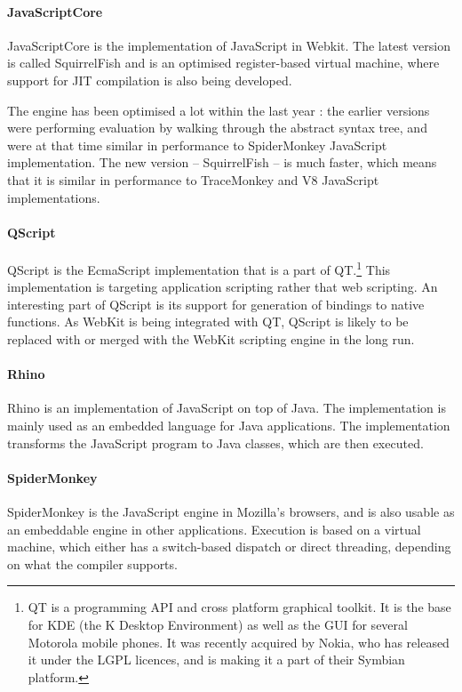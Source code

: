 \documentclass[11pt]{report}
\begin{document}
\paragraph{JavaScriptCore} 
JavaScriptCore \cite{webkit-src} is the implementation of JavaScript in Webkit.
The latest version is called SquirrelFish and is an optimised register-based virtual machine,
where support for JIT compilation is also being developed.

The engine has been optimised a lot within the last year 
\cite{squirrelfish-bench}: the earlier versions were performing evaluation by walking through the abstract syntax tree, and were at that time similar in performance to SpiderMonkey JavaScript implementation.
The new version -- SquirrelFish -- is much faster, which means that it is similar in performance to TraceMonkey and V8 JavaScript implementations.

\paragraph{QScript}
QScript \cite{qt} is the EcmaScript implementation that is a part of QT.\footnote{QT is a programming API and cross platform graphical toolkit. It is the base for KDE (the K Desktop Environment) as well as the GUI for several Motorola mobile phones. It was recently acquired by Nokia, who has released it under the LGPL licences, and is making it a part of their Symbian platform.} This implementation is targeting application scripting rather that web scripting. An interesting part of QScript is its support for generation of bindings to native functions. As WebKit is being integrated with QT, QScript is likely to be replaced with or merged with the WebKit scripting engine in the long run.

\paragraph{Rhino}
Rhino \cite{rhino} is an implementation of JavaScript on top of Java. The implementation is mainly used as an embedded language for Java applications. The implementation transforms the JavaScript program to Java classes, which are then executed.

\paragraph{SpiderMonkey}
\label{spidermonkey}
SpiderMonkey \cite{spidermonkey} is the JavaScript engine in Mozilla's browsers, and is also usable as an embeddable engine in other applications. Execution is based on a virtual machine, which either has a switch-based dispatch or direct threading, depending on what the compiler supports.
\end{document}
